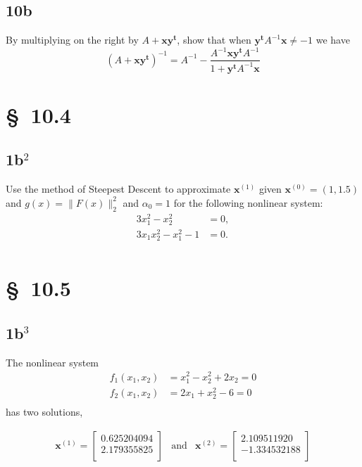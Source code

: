 \documentclass[12pt]{article}
\begin{document}
\newpage
\subsection{10b}
By multiplying on the right by $A + \mathbf{x y^{t}}$, show that when
$\mathbf{y^{t}} A^{-1} \mathbf{x} \ne -1$ we have
\begin{equation}
  \label{eq:10b}
  (A+\mathbf{x y^{t}})^{-1} = A^{-1} - \frac{A^{-1} \mathbf{x y^{t}} A^{-1}}{1+\mathbf{y^{t}}A^{-1}\mathbf{x}}
\end{equation}

\section{\S~10.4}
\subsection{1b$^2$}
Use the method of Steepest Descent to approximate $\mathbf{x}^{(1)}$
given $\mathbf{x}^{(0)}=(1,1.5)$ and $g(x)=\|F(x)\|_2^2$ and
$\alpha_0=1$ for the following nonlinear system:
\begin{align*}
  3x_1^2-x_2^2&=0, \\
  3x_1x_2^2-x_1^2-1&=0. \\
\end{align*}

\section{\S~10.5}
\subsection{1b$^3$}
The nonlinear system
\begin{align*}
  f_1(x_1,x_2)&=x_1^2-x_2^2+2x_2 =0 \\
  f_2(x_1,x_2)&=2x_1+x_2^2-6 =0 \\
\end{align*}
has two solutions,

\begin{equation*}
  \begin{array}{ccc}
    \mathbf{x}^{(1)}=
    \begin{bmatrix}
      0.625204094 \\
      2.179355825 \\
    \end{bmatrix}
    &
    \mathrm{and}
    &
    \mathbf{x}^{(2)}=
    \begin{bmatrix}
      2.109511920 \\
      −1.334532188 \\
    \end{bmatrix}
  \end{array}
\end{equation*}
\end{document}

